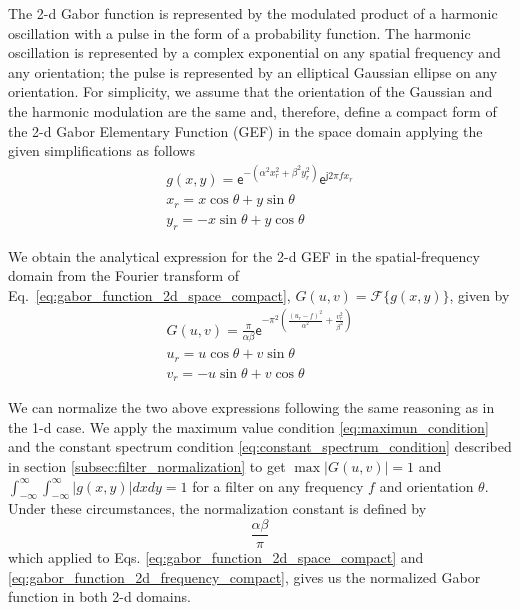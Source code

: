The 2-d Gabor function is represented by the modulated product of a harmonic oscillation with a pulse in the form of a probability function. The harmonic oscillation is represented by a complex exponential on any spatial frequency and any orientation; the pulse is represented by an elliptical Gaussian ellipse on any orientation. For simplicity, we assume that the orientation of the Gaussian and the harmonic modulation are the same and, therefore, define a compact form of the 2-d Gabor Elementary Function (GEF) in the space domain applying the given simplifications as follows
\begin{equation}\label{eq:gabor_function_2d_space_compact}
    \begin{gathered}
        g(x, y) =  \mathsf{e}^{-\left(\alpha^2 x_r^2 + \beta^2 y_r^2\right)} \mathsf{e}^{\mathsf{j} 2 \pi f x_r } \\
        x_r = x \cos{\theta} + y \sin{\theta}\\
        y_r = -x \sin{\theta} + y \cos{\theta}
     \end{gathered}
\end{equation}

We obtain the analytical expression for the 2-d GEF in the spatial-frequency domain from the Fourier transform of Eq.\ \eqref{eq:gabor_function_2d_space_compact}, $G(u, v) = \mathcal{F}\{g(x, y)\}$, given by 
\begin{equation}\label{eq:gabor_function_2d_frequency_compact}
    \begin{gathered}
        G(u, v) =  \frac{\pi}{\alpha \beta} \mathsf{e}^{- \pi^2 \left(\frac{\left( u_r - f\right)^2}{\alpha^2} + \frac{v_r^2}{\beta^2}\right)} \\
        u_r = u \cos{\theta} + v \sin{\theta}\\
        v_r = -u \sin{\theta} + v \cos{\theta}
     \end{gathered}
\end{equation}

We can normalize the two above expressions following the same reasoning as in the 1-d case. We apply the maximum value condition \eqref{eq:maximun_condition} and the constant spectrum condition \eqref{eq:constant_spectrum_condition} described in section \ref{subsec:filter_normalization} to get $\max{|G(u,v)|} = 1$ and $\int_{-\infty}^{\infty} \int_{-\infty}^{\infty} |g(x,y)| dx dy = 1$ for a filter on any frequency $f$ and orientation $\theta$. 
Under these circumstances, the normalization constant is defined by
\begin{equation}\label{eq:normalization_constant_2d}
    \frac{\alpha \beta}{\pi}
\end{equation}
which applied to Eqs. \eqref{eq:gabor_function_2d_space_compact}  and \eqref{eq:gabor_function_2d_frequency_compact}, gives us the normalized Gabor function in both 2-d domains. 

